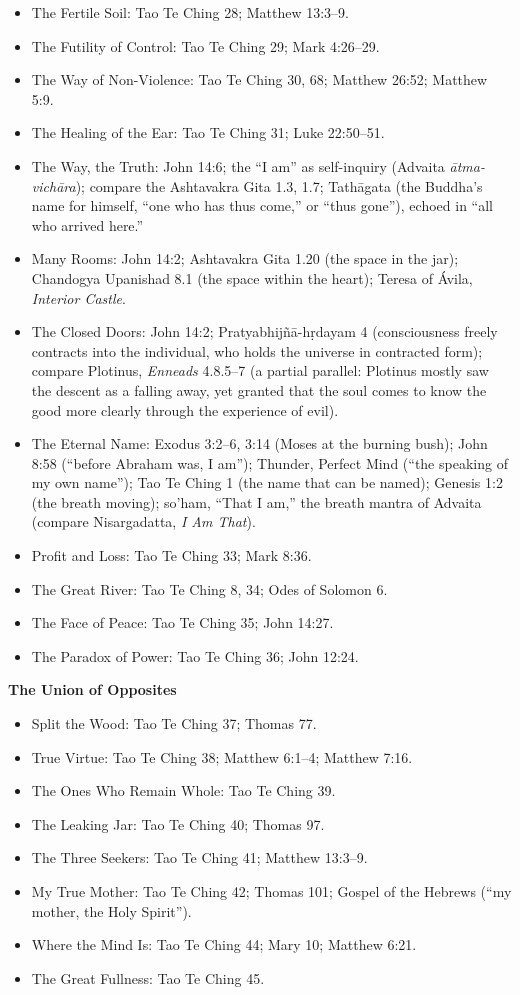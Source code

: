 \documentclass[10pt, openright]{book}
\providecommand{\tightlist}{\setlength{\itemsep}{0pt}\setlength{\parskip}{0pt}}
\begin{document}
\begin{itemize}
\tightlist
\item
  The Fertile Soil: Tao Te Ching 28; Matthew 13:3--9.
\item
  The Futility of Control: Tao Te Ching 29; Mark 4:26--29.
\item
  The Way of Non-Violence: Tao Te Ching 30, 68; Matthew 26:52; Matthew
  5:9.
\item
  The Healing of the Ear: Tao Te Ching 31; Luke 22:50--51.
\item
  The Way, the Truth: John 14:6; the ``I am'' as self-inquiry (Advaita
  \emph{ātma-vichāra}); compare the Ashtavakra Gita 1.3, 1.7; Tathāgata
  (the Buddha's name for himself, ``one who has thus come,'' or ``thus
  gone''), echoed in ``all who arrived here.''
\item
  Many Rooms: John 14:2; Ashtavakra Gita 1.20 (the space in the jar);
  Chandogya Upanishad 8.1 (the space within the heart); Teresa of Ávila,
  \emph{Interior Castle}.
\item
  The Closed Doors: John 14:2; Pratyabhijñā-hṛdayam 4 (consciousness
  freely contracts into the individual, who holds the universe in
  contracted form); compare Plotinus, \emph{Enneads} 4.8.5--7 (a partial
  parallel: Plotinus mostly saw the descent as a falling away, yet
  granted that the soul comes to know the good more clearly through the
  experience of evil).
\item
  The Eternal Name: Exodus 3:2--6, 3:14 (Moses at the burning bush);
  John 8:58 (``before Abraham was, I am''); Thunder, Perfect Mind (``the
  speaking of my own name''); Tao Te Ching 1 (the name that can be
  named); Genesis 1:2 (the breath moving); so'ham, ``That I am,'' the
  breath mantra of Advaita (compare Nisargadatta, \emph{I Am That}).
\item
  Profit and Loss: Tao Te Ching 33; Mark 8:36.
\item
  The Great River: Tao Te Ching 8, 34; Odes of Solomon 6.
\item
  The Face of Peace: Tao Te Ching 35; John 14:27.
\item
  The Paradox of Power: Tao Te Ching 36; John 12:24.
\end{itemize}

\textbf{The Union of Opposites}

\begin{itemize}
\tightlist
\item
  Split the Wood: Tao Te Ching 37; Thomas 77.
\item
  True Virtue: Tao Te Ching 38; Matthew 6:1--4; Matthew 7:16.
\item
  The Ones Who Remain Whole: Tao Te Ching 39.
\item
  The Leaking Jar: Tao Te Ching 40; Thomas 97.
\item
  The Three Seekers: Tao Te Ching 41; Matthew 13:3--9.
\item
  My True Mother: Tao Te Ching 42; Thomas 101; Gospel of the Hebrews
  (``my mother, the Holy Spirit'').
\item
  Where the Mind Is: Tao Te Ching 44; Mary 10; Matthew 6:21.
\item
  The Great Fullness: Tao Te Ching 45.
\end{itemize}
\end{document}
